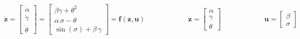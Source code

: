 \begin{equation*}

  \dot{\bm{z}} =

  \begin{bmatrix}
    \dot{\alpha}  \\
    \dot{\gamma}  \\
    \dot{\theta}
  \end{bmatrix}

  =

  \begin{bmatrix}
    \beta \gamma + \theta^2 \\
    \alpha \, \sigma  - \theta\\
    \sin(\sigma) + \beta \, \gamma
  \end{bmatrix}

  = \bm{f}(\bm{z}, \bm{u})

  \quad \quad \quad \quad \quad \quad

  \bm{z} =
  \begin{bmatrix}
    \alpha \\
    \gamma \\
    \theta
  \end{bmatrix}

\quad \quad \quad \quad \quad \quad

  \bm{u} =
  \begin{bmatrix}
    \beta \\
    \sigma
  \end{bmatrix}


\end{equation*}



